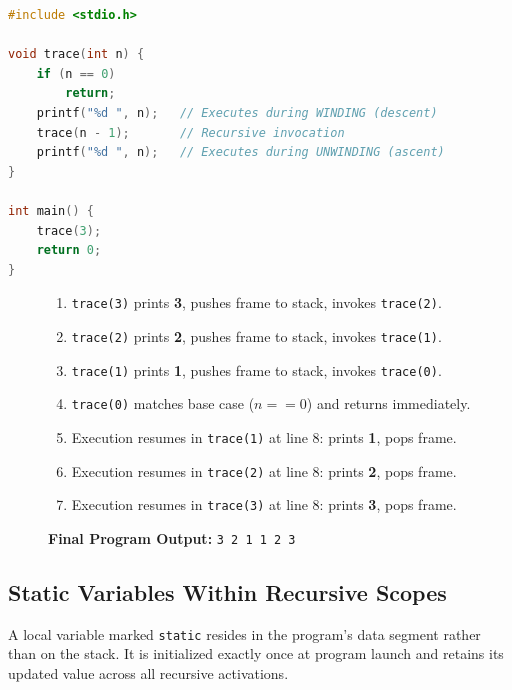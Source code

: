 \begin{lstlisting}[language=C]
#include <stdio.h>

void trace(int n) {
    if (n == 0)
        return;
    printf("%d ", n);   // Executes during WINDING (descent)
    trace(n - 1);       // Recursive invocation
    printf("%d ", n);   // Executes during UNWINDING (ascent)
}

int main() {
    trace(3);
    return 0;
}
\end{lstlisting}

\begin{figure}[htbp]
\centering
\begin{tcolorbox}[colback=white,colframe=primary,title=\textbf{Call Stack Trace for \texttt{trace(3)}}]
\begin{enumerate}[leftmargin=*]
    \item \texttt{trace(3)} prints \textbf{3}, pushes frame to stack, invokes \texttt{trace(2)}.
    \item \texttt{trace(2)} prints \textbf{2}, pushes frame to stack, invokes \texttt{trace(1)}.
    \item \texttt{trace(1)} prints \textbf{1}, pushes frame to stack, invokes \texttt{trace(0)}.
    \item \texttt{trace(0)} matches base case ($n == 0$) and returns immediately.
    \item Execution resumes in \texttt{trace(1)} at line 8: prints \textbf{1}, pops frame.
    \item Execution resumes in \texttt{trace(2)} at line 8: prints \textbf{2}, pops frame.
    \item Execution resumes in \texttt{trace(3)} at line 8: prints \textbf{3}, pops frame.
\end{enumerate}
\textbf{Final Program Output:} \texttt{3 2 1 1 2 3}
\end{tcolorbox}
\end{figure}

\subsection{Static Variables Within Recursive Scopes}
A local variable marked \texttt{static} resides in the program's data segment rather than on the stack. It is initialized exactly once at program launch and retains its updated value across all recursive activations.

